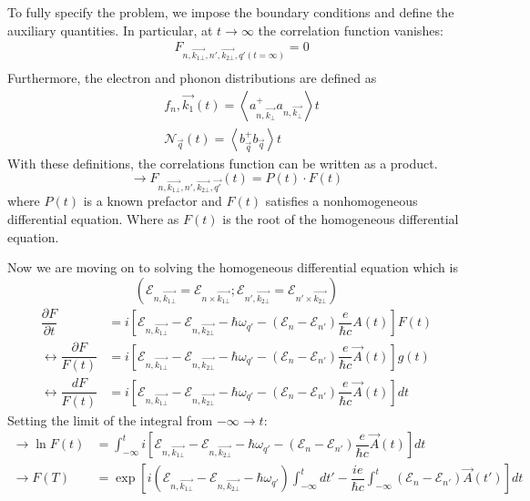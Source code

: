 \documentclass{article}
\begin{document}
To fully specify the problem, we impose the boundary conditions and define the auxiliary quantities. In particular, at $t\to \infty$ the correlation function vanishes:
\begin{align*}
    & F_{n,\vec{k_{1\bot}}, n', \vec{k_{2\bot}},q'(t = \infty )} = 0 \\
\end{align*}
Furthermore, the electron and phonon distributions are defined as
\begin{align*}
    & f_n, \vec{k_{1}}(t) = \left \langle a^+_{n, \vec{k_{\bot}}}a_{n, \vec{k_\bot}} \right \rangle t \\
    & \mathcal{N}_{\vec{q}}(t) = \left \langle b^+_{\vec{q}} b_{\vec{q}} \right\rangle t
\end{align*}
With these definitions, the correlations function can be written as a product.
\begin{equation*}
    \rightarrow F_{n, \vec{k_{1\bot}}, n', \vec{k_{2\bot}}, \vec{q'}}{(t)}= P(t) \cdot F (t)
\end{equation*}
where $P(t)$ is a known prefactor and $F(t)$ satisfies a nonhomogeneous differential equation. Where as $F(t)$ is the root of the homogeneous differential equation.


Now we are moving on to solving the homogeneous differential equation which is $$\left( \mathcal{E}_{n,\vec{k_{1\bot}}} = \mathcal{E}_{n\times\vec{k_{1\bot}}}; \mathcal{E}_{n',\vec{k_{2\bot}}}=\mathcal{E}_{n'\times\vec{k_{2\bot}}}\right)$$
\begin{align*}
    \dfrac{\partial F}{\partial t} &= i \left[\mathcal{E}_{n,\vec{k_{1\bot}}}- \mathcal{E}_{n,\vec{k_{2\bot}}}-\hbar\omega_{q'} - \left(\mathcal{E}_n -\mathcal{E}_{n'}\right)\dfrac{e}{\hbar c}A(t)\right] F(t)\\
    \leftrightarrow \dfrac{\partial F}{F(t)}&= i \left[\mathcal{E}_{n,\vec{k_{1\bot}}}- \mathcal{E}_{n,\vec{k_{2\bot}}}-\hbar\omega_{q'} - \left(\mathcal{E}_n -\mathcal{E}_{n'}\right)\dfrac{e}{\hbar c}\vec{A}(t)\right] g(t) \\
    \leftrightarrow \dfrac{dF}{F(t)}&= i \left[\mathcal{E}_{n,\vec{k_{1\bot}}}- \mathcal{E}_{n,\vec{k_{2\bot}}}-\hbar\omega_{q'} - \left(\mathcal{E}_n -\mathcal{E}_{n'}\right)\dfrac{e}{\hbar c}\vec{A}(t)\right] dt
\end{align*}
\newpage
Setting the limit of the integral from $-\infty \to t$:
\begin{align*}
    \rightarrow \ln{F(t)} &= \int^t_{-\infty} i \left[\mathcal{E}_{n,\vec{k_{1\bot}}}- \mathcal{E}_{n,\vec{k_{2\bot}}}-\hbar\omega_{q'} - \left(\mathcal{E}_n -\mathcal{E}_{n'}\right)\dfrac{e}{\hbar c}\vec{A}(t)\right] dt \\
    \rightarrow F(T) & = \exp \left[i \left(\mathcal{E}_{n,\vec{k_{1\bot}}}- \mathcal{E}_{n,\vec{k_{2\bot}}}-\hbar\omega_{q'}\right) \int^t_{-\infty}dt'- \dfrac{ie}{\hbar c} \int^t_{-\infty}\left(\mathcal{E}_n -\mathcal{E}_{n'}\right)\vec{A}(t')\right] dt
\end{align*}
\end{document}
